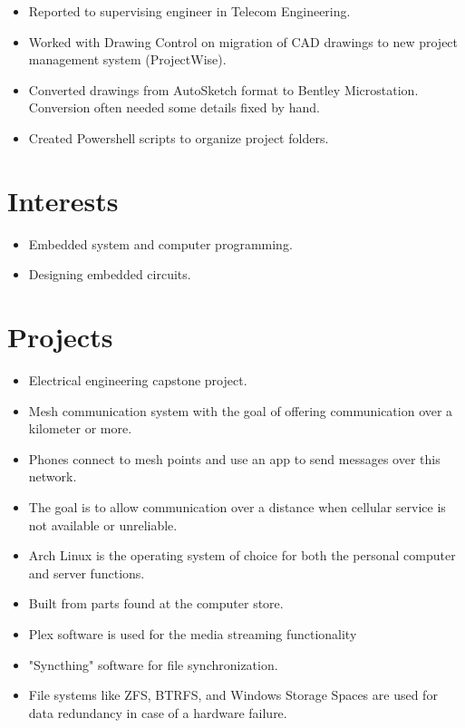 \documentclass{lsanche_cv}
\begin{document}
\begin{multicols*}{2}
    \divider

    \begin{itemize}
      \item Reported to supervising engineer in Telecom Engineering.
      \item Worked with Drawing Control on migration of CAD drawings to new project management system (ProjectWise).
      \item Converted drawings from AutoSketch format to Bentley Microstation. Conversion often needed some details fixed by hand.
      \item Created Powershell scripts to organize project folders.
    \end{itemize}

    \columnbreak
    
  \section{Interests}
    \begin{itemize}
      \item Embedded system and computer programming.
      \item Designing embedded circuits.
    \end{itemize}

    \section{Projects}

      \begin{itemize}
        \item Electrical engineering capstone project.
        \item Mesh communication system with the goal of offering communication over a kilometer or more. 
        \item Phones connect to mesh points and use an app to send messages over this network.
        \item The goal is to allow communication over a distance when cellular service is not available or unreliable.
      \end{itemize}

    \divider

      \begin{itemize}
        \item Arch Linux is the operating system of choice for both the personal computer and server functions.
        \item Built from parts found at the computer store.
        \item Plex software is used for the media streaming functionality
        \item "Syncthing" software for file synchronization.
        \item File systems like ZFS, BTRFS, and Windows Storage Spaces are used for data redundancy in case of a hardware failure.
      \end{itemize}


\end{multicols*}
\end{document}
